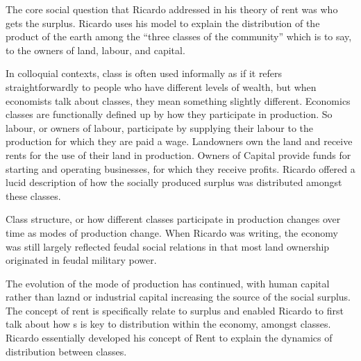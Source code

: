  The core social question that Ricardo addressed in his theory of rent \cite{ricardo-rent}
 was who gets the surplus. %
Ricardo uses his model to explain the distribution of the product of the earth among the “three classes of the community” which is to say, to the owners of land, labour, and capital. 

In colloquial contexts, class is often used informally as if it refers straightforwardly to people who have different levels of wealth, but when economists talk about classes, they mean something slightly different. Economics classes are functionally defined up by how they participate in production. So labour, or owners of labour, participate by supplying their labour to the production for which they are paid a wage. Landowners own the land and receive rents for the use of their land in production. Owners of Capital provide funds for starting and operating businesses, for which they receive profits.  Ricardo offered a lucid description of  how the socially produced surplus was distributed amongst these classes. %

 Class structure, or how different classes participate in production changes over time as modes of production change. When Ricardo was writing, the economy was still largely reflected feudal social relations in that most land ownership originated in feudal military power. %
 
The evolution of the mode of production has continued, with human capital rather than laznd or industrial capital increasing the source of the social surplus. The concept of rent is specifically relate to surplus and enabled Ricardo to first talk about how s is key to distribution within the economy, amongst classes.  Ricardo essentially developed his concept of Rent to explain the dynamics of distribution between classes. 



